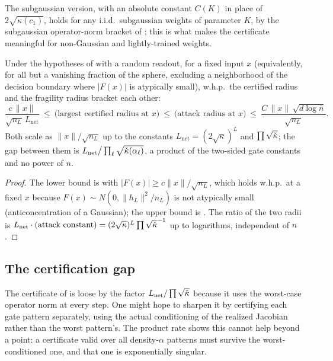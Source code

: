The subgaussian version, with an absolute constant $C(K)$ in place of $2\sqrt{\kappa(c_1)}$, holds for
any i.i.d.\ subgaussian weights of parameter $K$, by the subgaussian operator-norm bracket of
; this is what makes the certificate meaningful for non-Gaussian and lightly-trained
weights.

\begin{corollary}\label{cor:sharp}
Under the hypotheses of  with a random readout, for a fixed input $x$ (equivalently, for
all but a vanishing fraction of the sphere, excluding a neighborhood of the decision boundary where
$|F(x)|$ is atypically small), w.h.p.\ the certified radius and the fragility radius bracket each other:
\[
  \frac{c\,\|x\|}{\sqrt{n_L}\,L_{\mathrm{net}}}\ \le\ \bigl(\text{largest certified radius at }x\bigr)\ \le\
  \bigl(\text{attack radius at }x\bigr)\ \le\ \frac{C\,\|x\|\,\sqrt{d\log\bar n}}{\sqrt{n_L}} .
\]
Both scale as $\|x\|/\sqrt{n_L}$ up to the constants $L_{\mathrm{net}}=(2\sqrt{\kappa})^L$ and
$\prod\sqrt{\check{\kappa}}$; the gap between them is $L_{\mathrm{net}}\big/\prod_\ell\sqrt{\check{\kappa}(\alpha_\ell)}$,
a product of the two-sided gate constants and no power of $n$.
\end{corollary}

\begin{proof}
The lower bound is  with $|F(x)|\ge c\|x\|/\sqrt{n_L}$, which holds w.h.p.\ at a
fixed $x$ because $F(x)\sim N(0,\|h_L\|^2/n_L)$ is not atypically small (anticoncentration of a
Gaussian); the upper bound is \Cref{thm:master}. The ratio of the two radii is
$L_{\mathrm{net}}\cdot(\text{attack constant})=(2\sqrt\kappa)^L\prod\sqrt{\check{\kappa}}^{-1}$ up to
logarithms, independent of $n$.
\end{proof}

\subsection{The certification gap}
The certificate of  is loose by the factor
$L_{\mathrm{net}}/\prod\sqrt{\check{\kappa}}$ because it uses the worst-case operator norm at every step. One
might hope to sharpen it by certifying each gate pattern separately, using the actual conditioning of
the realized Jacobian rather than the worst pattern's. The product rate shows this cannot help beyond a
point: a certificate valid over all density-$\alpha$ patterns must survive the worst-conditioned one,
and that one is exponentially singular.

